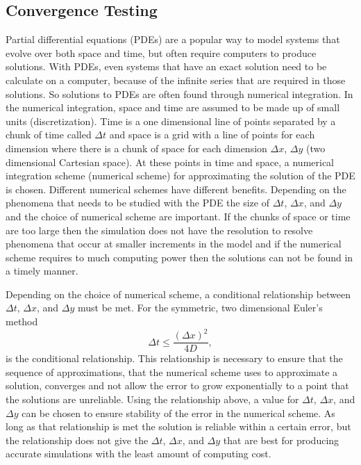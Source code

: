 \subsection{Convergence Testing}

Partial differential equations (PDEs) are a popular way to model systems that evolve over both space and time, but often require computers to produce solutions. With PDEs, even systems that have an exact solution need to be calculate on a computer, because of the infinite series that are required in those solutions. So solutions to PDEs are often found through numerical integration. In the numerical integration, space and time are assumed to be made up of small units (discretization). Time is a one dimensional line of points separated by a chunk of time called $\Delta t$ and space is a grid with a line of points for each dimension where there is a chunk of space for each dimension $\Delta x$, $\Delta y$ (two dimensional Cartesian space). At these points in time and space, a numerical integration scheme (numerical scheme) for approximating the solution of the PDE is chosen. Different numerical schemes have different benefits. Depending on the phenomena that needs to be studied with the PDE the size of $\Delta t$, $\Delta x$, and $\Delta y$ and the choice of numerical scheme are important. If the chunks of space or time are too large then the simulation does not have the resolution to resolve phenomena that occur at smaller increments in the model and if the numerical scheme requires to much computing power then the solutions can not be found in a timely manner.

Depending on the choice of numerical scheme, a conditional relationship between $\Delta t$, $\Delta x$, and $\Delta y$ must be met. For the symmetric, two dimensional Euler's method $$ \Delta t \leq \frac{(\Delta x)^{2}}{4 D},$$ is the conditional relationship. \citep{wendroff_difference_1968,olsen-kettle_numerical_nodate} This relationship is necessary to ensure that the sequence of approximations, that the numerical scheme uses to approximate a solution, converges and not allow the error to grow exponentially to a point that the solutions are unreliable. Using the relationship above, a value for $\Delta t$, $\Delta x$, and $\Delta y$ can be chosen to ensure stability of the error in the numerical scheme. As long as that relationship is met the solution is reliable within a certain error, but the relationship does not give the $\Delta t$, $\Delta x$, and $\Delta y$ that are best for producing accurate simulations with the least amount of computing cost.

